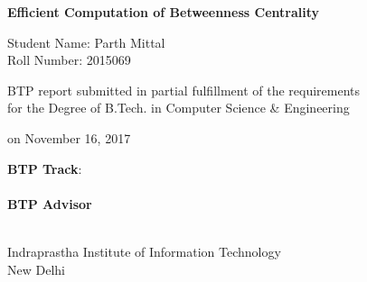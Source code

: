 \begin{center}

\vspace{5.65in}

{\LARGE \bf {Efficient Computation of Betweenness Centrality}

 }  
 \vspace{.3in}
 
 {\Large{Student Name: Parth Mittal}} \\  
 {\large{Roll Number: 2015069}} \\  
 \vspace{.1in} 


  
    \vspace{.65in}



\vspace{.65in}


 {BTP report submitted in partial fulfillment of the requirements 
\\for the Degree of B.Tech. in Computer Science \& Engineering}


on {November 16, 2017} \\

\vspace{.65in}

\textbf{BTP Track}: \btptrack\\
\quad\\

  {\textbf{BTP Advisor} \\ 
	\supervisorone              \\  }
\vspace{3.0in}


{Indraprastha Institute of Information Technology\\
New Delhi}



\end{center}


